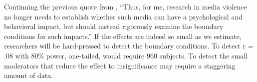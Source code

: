 \documentclass[man]{apa6}
\begin{document}
Continuing the previous quote from \citet[p. 62]{Warburton:2014}, %
``Thus, for me, research in media violence no longer needs to establish whether such media can have a psychological and behavioral impact, but should instead rigorously examine the boundary conditions for such impacts.'' If the effects are indeed so small as we estimate, researchers will be hard-pressed to detect the boundary conditions. To detect r = .08 with 80\% power, one-tailed, would require 960 subjects. To detect the small moderators that reduce the effect to insignificance may require a staggering amount of data.




\newpage


\end{document}
